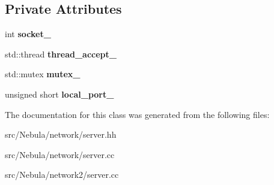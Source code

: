 \subsection*{\-Private \-Attributes}
\begin{DoxyCompactItemize}
\item 
\hypertarget{classgal_1_1network_1_1server_ab30387fed262865c5b4fdaf31127e03f}{int {\bfseries socket\-\_\-}}\label{classgal_1_1network_1_1server_ab30387fed262865c5b4fdaf31127e03f}

\item 
\hypertarget{classgal_1_1network_1_1server_ac269b4e460b0907bb6c12e400bd35b4f}{std\-::thread {\bfseries thread\-\_\-accept\-\_\-}}\label{classgal_1_1network_1_1server_ac269b4e460b0907bb6c12e400bd35b4f}

\item 
\hypertarget{classgal_1_1network_1_1server_aa431c88e212e3d616be9e94f9701e3ee}{std\-::mutex {\bfseries mutex\-\_\-}}\label{classgal_1_1network_1_1server_aa431c88e212e3d616be9e94f9701e3ee}

\item 
\hypertarget{classgal_1_1network_1_1server_acfcf5712d71ffa9b03b0e53a69d68d77}{unsigned short {\bfseries local\-\_\-port\-\_\-}}\label{classgal_1_1network_1_1server_acfcf5712d71ffa9b03b0e53a69d68d77}

\end{DoxyCompactItemize}


\-The documentation for this class was generated from the following files\-:\begin{DoxyCompactItemize}
\item 
src/\-Nebula/network/server.\-hh\item 
src/\-Nebula/network/server.\-cc\item 
src/\-Nebula/network2/server.\-cc\end{DoxyCompactItemize}
